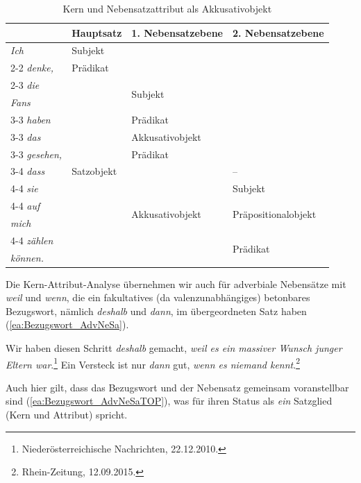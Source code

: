 \begin{table}
  \centering
  \begin{tabular}{l|l|l|l}
      & Hauptsatz  & 1. Nebensatzebene &  2. Nebensatzebene \\
    \hline
    \textit{Ich} & Subjekt & & \\ \cline{2-2}
    \textit{denke,} & Prädikat  & & \\ \cline{2-3}
    \textit{die} & \multirow{12}{*}{Satzobjekt} & \multirow{2}{*}{Subjekt} &  \\  
    \textit{Fans} & & & \\ \cline{3-3}  
    \textit{haben} & & Prädikat & \\ \cline{3-3}
    \textit{das} & & Akkusativobjekt & \\ \cline{3-3} 
    \textit{gesehen,} & & Prädikat \\ \cline{3-4}
    \textit{dass} & & \multirow{6}{*}{Akkusativobjekt} & -- \\ \cline{4-4}
    \textit{sie} & & & Subjekt \\ \cline{4-4} 
    \textit{auf} & & & \multirow{2}{*}{Präpositionalobjekt} \\ 
    \textit{mich} &  & & \\ \cline{4-4}
    \textit{zählen} & & & \multirow{2}{*}{Prädikat} \\
    \textit{können.} & & & \\
    \hline 
  \end{tabular}
  \caption{Kern und Nebensatzattribut als Akkusativobjekt}
  \label{tab:ProDAS_NeSa_Atrribut}
\end{table}

Die Kern-Attribut-Analyse übernehmen wir auch für adverbiale Nebensätze mit \textit{weil} und \textit{wenn}, die ein fakultatives (da valenzunabhängiges) betonbares Bezugswort, nämlich \textit{deshalb} und \textit{dann}, im übergeordneten Satz haben (\ref{ea:Bezugswort_AdvNeSa}).

\ea \label{ea:Bezugswort_AdvNeSa}
\ea \label{ea:deshalb_weil} Wir haben diesen Schritt \textit{deshalb} gemacht, \textit{weil es ein massiver Wunsch junger Eltern war}.\footnote{Niederösterreichische Nachrichten, 22.12.2010.}
\ex \label{ex:dann_wenn} Ein Versteck ist nur \textit{dann} gut, \textit{wenn es niemand kennt}.\footnote{Rhein-Zeitung, 12.09.2015.}
\z 
\z 

Auch hier gilt, dass das Bezugswort und der Nebensatz gemeinsam voranstellbar sind (\ref{ea:Bezugswort_AdvNeSaTOP}), was für ihren Status als \textit{ein} Satzglied (Kern und Attribut) spricht.

